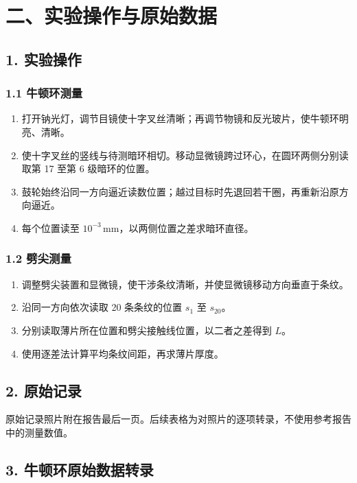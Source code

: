\section*{二、实验操作与原始数据}

\subsection*{1. 实验操作}

\subsubsection*{1.1 牛顿环测量}

\begin{enumerate}
  \item 打开钠光灯，调节目镜使十字叉丝清晰；再调节物镜和反光玻片，使牛顿环明亮、清晰。
  \item 使十字叉丝的竖线与待测暗环相切。移动显微镜跨过环心，在圆环两侧分别读取第 17 至第 6 级暗环的位置。
  \item 鼓轮始终沿同一方向逼近读数位置；越过目标时先退回若干圈，再重新沿原方向逼近。
  \item 每个位置读至 $10^{-3}\,\mathrm{mm}$，以两侧位置之差求暗环直径。
\end{enumerate}

\subsubsection*{1.2 劈尖测量}

\begin{enumerate}
  \item 调整劈尖装置和显微镜，使干涉条纹清晰，并使显微镜移动方向垂直于条纹。
  \item 沿同一方向依次读取 20 条条纹的位置 $s_1$ 至 $s_{20}$。
  \item 分别读取薄片所在位置和劈尖接触线位置，以二者之差得到 $L$。
  \item 使用逐差法计算平均条纹间距，再求薄片厚度。
\end{enumerate}

\subsection*{2. 原始记录}

原始记录照片附在报告最后一页。后续表格为对照片的逐项转录，不使用参考报告中的测量数值。

\subsection*{3. 牛顿环原始数据转录}


